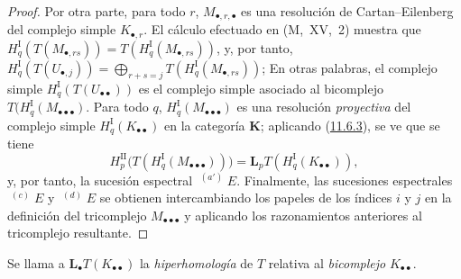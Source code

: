 \documentclass[10pt,oneside,openany]{book}
\theoremstyle{egaenv}\newtheorem*{env}{---}
\theoremstyle{egastatement}
\theoremstyle{egadescription}
\begin{document}
\begin{proof}
Por otra parte, para todo $r$, $M_{\bullet,r,\bullet}$ es una
resolución de Cartan--Eilenberg del complejo simple $K_{\bullet,r}$.
El cálculo efectuado en (M,~XV,~2) muestra que
$H_q^{\mathrm I}(T(M_{\bullet,rs}))=T(H_q^{\mathrm I}(M_{\bullet,rs}))$,
y, por tanto,
$H_q^{\mathrm I}(T(U_{\bullet,j}))=\bigoplus_{r+s=j}T(H_q^{\mathrm I}(M_{\bullet,rs}))$;
En otras palabras, el complejo simple
$H_q^{\mathrm I}(T(U_{\bullet\bullet}))$ es el complejo simple
asociado al bicomplejo
$T(H_q^{\mathrm I}(M_{\bullet\bullet\bullet})$.
Para todo $q$, $H_q^{\mathrm I}(M_{\bullet\bullet\bullet})$ es una resolución \emph{proyectiva} del complejo simple $H_q^{\mathrm I}(K_{\bullet\bullet})$ en la categoría $\boldsymbol{K}$; aplicando (\hyperref[0.11.6.3-fr]{11.6.3}), se ve que se tiene
\[
H_p^{\mathrm{II}}
\bigl(T(H_q^{\mathrm I}(M_{\bullet\bullet\bullet}))\bigr)
=\mathbf{L}_pT(H_q^{\mathrm I}(K_{\bullet\bullet})),
\]
y, por tanto, la sucesión espectral $\mathop{}^{(a')}E$.
Finalmente, las sucesiones espectrales $\mathop{}^{(c)}E$ y
$\mathop{}^{(d)}E$ se obtienen intercambiando los papeles de los
índices $i$ y $j$ en la definición del tricomplejo
$M_{\bullet\bullet\bullet}$ y aplicando los razonamientos anteriores al
tricomplejo resultante.
\end{proof}

Se llama a $\mathbf{L}_\bullet T(K_{\bullet\bullet})$ la \emph{hiperhomología} de
$T$ relativa al \emph{bicomplejo} $K_{\bullet\bullet}$.
\end{document}
